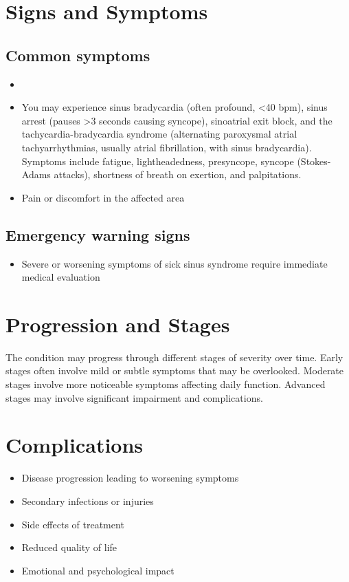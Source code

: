 \section{Signs and Symptoms}

\subsection{Common symptoms}
\begin{itemize}[noitemsep]
  \item \item You may experience sinus bradycardia (often profound, <40 bpm), sinus arrest (pauses >3 seconds causing syncope), sinoatrial exit block, and the tachycardia-bradycardia syndrome (alternating paroxysmal atrial tachyarrhythmias, usually atrial fibrillation, with sinus bradycardia). Symptoms include fatigue, lightheadedness, presyncope, syncope (Stokes-Adams attacks), shortness of breath on exertion, and palpitations.

  \item Pain or discomfort in the affected area
  \end{itemize}

\subsection{Emergency warning signs}
\begin{itemize}[noitemsep]
  \item Severe or worsening symptoms of sick sinus syndrome require immediate medical evaluation
\end{itemize}
\section{Progression and Stages}
The condition may progress through different stages of severity over time. Early stages often involve mild or subtle symptoms that may be overlooked. Moderate stages involve more noticeable symptoms affecting daily function. Advanced stages may involve significant impairment and complications.
\section{Complications}
\begin{itemize}[noitemsep]
  \item Disease progression leading to worsening symptoms
  \item Secondary infections or injuries
  \item Side effects of treatment
  \item Reduced quality of life
  \item Emotional and psychological impact
\end{itemize}
